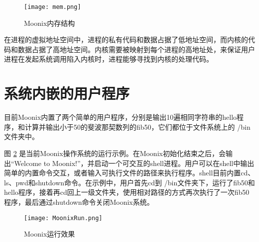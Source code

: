 \begin{figure}[htpb]
	\centering
	\texttt{[image: mem.png]}
	\setlength{\abovecaptionskip}{2pt}
	\caption{Moonix内存结构}
	\label{pic:moonixmem}
\end{figure}

在进程的虚拟地址空间中，进程的私有代码和数据占据了低地址空间，而内核的代码和数据占据了高地址空间。内核需要被映射到每个进程的高地址处，来保证用户进程在发起系统调用陷入内核时，进程能够寻找到内核的处理代码。

\section{系统内嵌的用户程序}

目前Moonix内置了两个简单的用户程序，分别是输出10遍相同字符串的hello程序，和计算并输出小于50的斐波那契数列的fib50，它们都位于文件系统上的 /bin文件夹中。

图 \ref{pic:moonixrun} 是当前Moonix操作系统的运行示例。在Moonix初始化结束之后，会输出“Welcome to Moonix!”，并启动一个可交互的shell进程。用户可以在shell中输出简单的内置命令交互，或者输入可执行文件的路径来执行程序。shell目前内置cd、ls、pwd和shutdown命令。在示例中，用户首先cd到 /bin文件夹下，运行了fib50和hello程序，接着再cd回上一级文件夹，使用相对路径的方式再次执行了一次fib50程序，最后通过shutdown命令关闭Moonix系统。

\clearpage

\begin{figure}[!h]
	\texttt{[image: MoonixRun.png]}
	\caption{Moonix运行效果}
	\label{pic:moonixrun}
\end{figure}